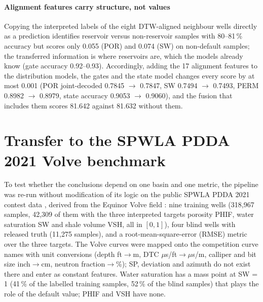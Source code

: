 \documentclass[preprint,12pt]{elsarticle}
\begin{document}
\paragraph{Alignment features carry structure, not values} Copying the interpreted labels of the eight DTW-aligned neighbour wells directly as a prediction identifies reservoir versus non-reservoir samples with 80--81\,\% accuracy but scores only 0.055 (POR) and 0.074 (SW) on non-default samples; the transferred information is where reservoirs are, which the models already know (gate accuracy 0.92--0.93). Accordingly, adding the 17 alignment features to the distribution models, the gates and the state model changes every score by at most 0.001 (POR joint-decoded 0.7845 $\to$ 0.7847, SW 0.7494 $\to$ 0.7493, PERM 0.8982 $\to$ 0.8979, state accuracy 0.9053 $\to$ 0.9060), and the fusion that includes them scores 81.642 against 81.632 without them.

\section{Transfer to the SPWLA PDDA 2021 Volve benchmark}
\label{sec:transfer}

To test whether the conclusions depend on one basin and one metric, the pipeline was re-run without modification of its logic on the public SPWLA PDDA 2021 contest data \cite{pddasig2021,fu2024contest}, derived from the Equinor Volve field \cite{volve2018}: nine training wells (318,967 samples, 42,309 of them with the three interpreted targets porosity PHIF, water saturation SW and shale volume VSH, all in $[0,1]$), four blind wells with released truth (11,275 samples), and a root-mean-square-error (RMSE) metric over the three targets. The Volve curves were mapped onto the competition curve names with unit conversions (depth ft$\to$m, DTC $\mu$s/ft$\to\mu$s/m, calliper and bit size inch$\to$cm, neutron fraction$\to$\%); SP, deviation and azimuth do not exist there and enter as constant features. Water saturation has a mass point at SW = 1 (41\,\% of the labelled training samples, 52\,\% of the blind samples) that plays the role of the default value; PHIF and VSH have none.
\end{document}
